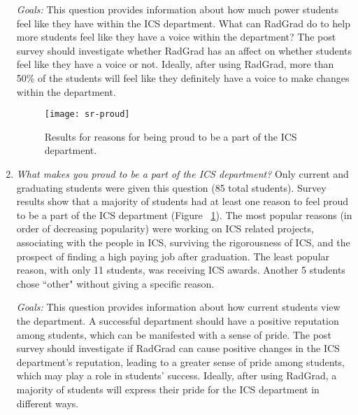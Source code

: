 \begin{enumerate}
\textit{Goals:} This question provides information about how much power students feel like they have within the ICS department. What can RadGrad do to help more students feel like they have a voice within the department? The post survey should investigate whether RadGrad has an affect on whether students feel like they have a voice or not. Ideally, after using RadGrad, more than 50\% of the students will feel like they definitely have a voice to make changes within the department.

\begin{figure}[h]
\centering
\texttt{[image: sr-proud]}
\caption{Results for reasons for being proud to be a part of the ICS department.}
\label{proud}
\end{figure}
\item \textit{What makes you proud to be a part of the ICS department?}
Only current and graduating students were given this question (85 total students). Survey results show that a majority of students had at least one reason to feel proud to be a part of the ICS department (Figure ~\ref{proud}). The most popular reasons (in order of decreasing popularity) were working on ICS related projects, associating with the people in ICS, surviving the rigorousness of ICS, and the prospect of finding a high paying job after graduation. The least popular reason, with only 11 students, was receiving ICS awards. Another 5 students chose ``other" without giving a specific reason. 

\textit{Goals:} This question provides information about how current students view the department. A successful department should have a positive reputation among students, which can be manifested with a sense of pride. The post survey should investigate if RadGrad can cause positive changes in the ICS department's reputation, leading to a greater sense of pride among students, which may play a role in students' success. Ideally, after using RadGrad, a majority of students will express their pride for the ICS department in different ways. 

\end{enumerate}

